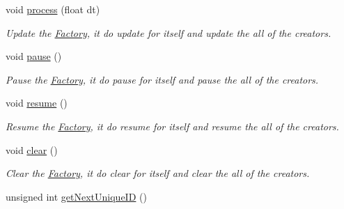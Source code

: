 \begin{DoxyCompactItemize}
\item 
void \hyperlink{class_i_dream_sky_1_1_entity_1_1_factory_a274df9f8d7d6f532cbd510a93b5a8445}{process} (float dt)
\begin{DoxyCompactList}\small\item\em Update the \hyperlink{class_i_dream_sky_1_1_entity_1_1_factory}{Factory}, it do update for itself and update the all of the creators. \end{DoxyCompactList}\item 
void \hyperlink{class_i_dream_sky_1_1_entity_1_1_factory_a5800621a1cfcab4ab08d837bec711e5a}{pause} ()\hypertarget{class_i_dream_sky_1_1_entity_1_1_factory_a5800621a1cfcab4ab08d837bec711e5a}{}\label{class_i_dream_sky_1_1_entity_1_1_factory_a5800621a1cfcab4ab08d837bec711e5a}

\begin{DoxyCompactList}\small\item\em Pause the \hyperlink{class_i_dream_sky_1_1_entity_1_1_factory}{Factory}, it do pause for itself and pause the all of the creators. \end{DoxyCompactList}\item 
void \hyperlink{class_i_dream_sky_1_1_entity_1_1_factory_aaca990e2fd0528031608ccc210488c9f}{resume} ()\hypertarget{class_i_dream_sky_1_1_entity_1_1_factory_aaca990e2fd0528031608ccc210488c9f}{}\label{class_i_dream_sky_1_1_entity_1_1_factory_aaca990e2fd0528031608ccc210488c9f}

\begin{DoxyCompactList}\small\item\em Resume the \hyperlink{class_i_dream_sky_1_1_entity_1_1_factory}{Factory}, it do resume for itself and resume the all of the creators. \end{DoxyCompactList}\item 
void \hyperlink{class_i_dream_sky_1_1_entity_1_1_factory_abfb492475d0e7b95875e7e1b2d4b5663}{clear} ()\hypertarget{class_i_dream_sky_1_1_entity_1_1_factory_abfb492475d0e7b95875e7e1b2d4b5663}{}\label{class_i_dream_sky_1_1_entity_1_1_factory_abfb492475d0e7b95875e7e1b2d4b5663}

\begin{DoxyCompactList}\small\item\em Clear the \hyperlink{class_i_dream_sky_1_1_entity_1_1_factory}{Factory}, it do clear for itself and clear the all of the creators. \end{DoxyCompactList}\item 
unsigned int \hyperlink{class_i_dream_sky_1_1_entity_1_1_factory_a7dcca4c85458ca892bb77a2206c2517a}{get\+Next\+Unique\+ID} ()\hypertarget{class_i_dream_sky_1_1_entity_1_1_factory_a7dcca4c85458ca892bb77a2206c2517a}{}\label{class_i_dream_sky_1_1_entity_1_1_factory_a7dcca4c85458ca892bb77a2206c2517a}


\end{DoxyCompactItemize}
